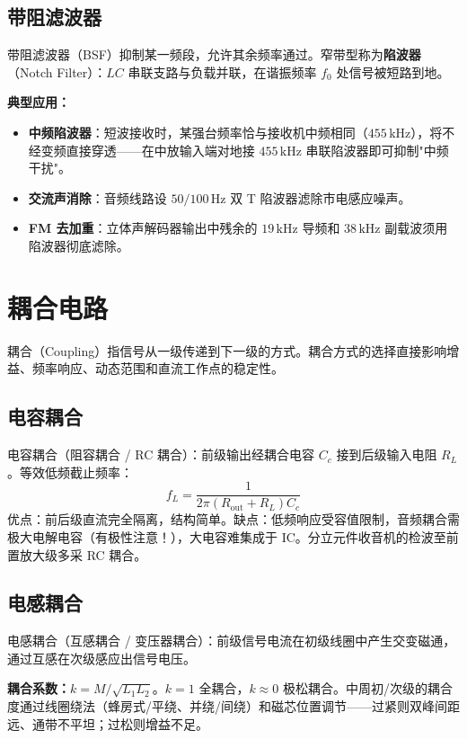 \documentclass[12pt,UTF8]{ctexbook}
\begin{document}
\subsection{带阻滤波器}

带阻滤波器（BSF）抑制某一频段，允许其余频率通过。窄带型称为\textbf{陷波器}（Notch Filter）：$LC$ 串联支路与负载并联，在谐振频率 $f_0$ 处信号被短路到地。

\textbf{典型应用：}
\begin{itemize}
  \item \textbf{中频陷波器}：短波接收时，某强台频率恰与接收机中频相同（$455\,\mathrm{kHz}$），将不经变频直接穿透——在中放输入端对地接 $455\,\mathrm{kHz}$ 串联陷波器即可抑制"中频干扰"。
  \item \textbf{交流声消除}：音频线路设 $50/100\,\mathrm{Hz}$ 双 T 陷波器滤除市电感应噪声。
  \item \textbf{FM 去加重}：立体声解码器输出中残余的 $19\,\mathrm{kHz}$ 导频和 $38\,\mathrm{kHz}$ 副载波须用陷波器彻底滤除。
\end{itemize}

\section{耦合电路}
\label{sec:coupling}

耦合（Coupling）指信号从一级传递到下一级的方式。耦合方式的选择直接影响增益、频率响应、动态范围和直流工作点的稳定性。

\subsection{电容耦合}

电容耦合（阻容耦合 / RC 耦合）：前级输出经耦合电容 $C_c$ 接到后级输入电阻 $R_L$。等效低频截止频率：
\[
f_L = \frac{1}{2\pi (R_{\text{out}} + R_L) C_c}
\]
优点：前后级直流完全隔离，结构简单。缺点：低频响应受容值限制，音频耦合需极大电解电容（有极性注意！），大电容难集成于 IC。分立元件收音机的检波至前置放大级多采 RC 耦合。

\subsection{电感耦合}

电感耦合（互感耦合 / 变压器耦合）：前级信号电流在初级线圈中产生交变磁通，通过互感在次级感应出信号电压。

\textbf{耦合系数：}$k = M/\sqrt{L_1 L_2}$。$k=1$ 全耦合，$k\approx 0$ 极松耦合。中周初/次级的耦合度通过线圈绕法（蜂房式/平绕、并绕/间绕）和磁芯位置调节——过紧则双峰间距远、通带不平坦；过松则增益不足。
\end{document}
